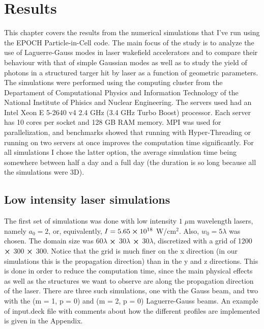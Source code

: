 \documentclass[12pt, class=report, crop=false]{standalone}
\begin{document}
\chapter{Results}%
\label{chap:results}

This chapter covers the results from the numerical simulations that I've run using the EPOCH Particle-in-Cell code. The main focus of the study is to analyze the use of Laguerre-Gauss modes in laser wakefield accelerators and to compare their behaviour with that of simple Gaussian modes as well as to study the yield of photons in a structured targer hit by laser as a function of geometric parameters. The simulations were performed using the computing cluster from the Departament of Computational Physics and Information Technology of the National Institute of Phisics and Nuclear Engineering. The servers used had an Intel\textsuperscript{\tiny\textregistered} Xeon\textsuperscript{\tiny\textregistered} E 5-2640 v4 2.4 GHz (3.4 GHz Turbo Boost) processor. Each server has 10 cores per socket and 128 GB RAM memory. MPI was used for parallelization, and benchmarks showed that running with Hyper-Threading or running on two servers at once improves the computation time significantly. For all simulations I chose the latter option, the average simulation time being somewhere between half a day and a full day (the duration is so long because all the simulations were 3D).

\section{Low intensity laser simulations}

The first set of simulations was done with low intensity \(1\; \mu\)m wavelength lasers, namely \(a_0 = 2\), or, equivalently, \(I = 5.65 \cp 10^{18}\) W/cm$^2$. Also, \(w_0 = 5\lambda\) was chosen. The domain size was 60$\lambda$ $\cp$ 30$\lambda$ $\cp$ 30$\lambda$, discretized with a grid of 1200 $\cp$ 300 $\cp$ 300. Notice that the grid is much finer on the x direction (in our simulations this is the propagation direction) than in the y and z directions. This is done in order to reduce the computation time, since the main physical effects as well as the structures we want to observe are along the propagation direction of the laser. There are three such simulations, one with the Gauss beam, and two with the (m = 1, p = 0) and (m = 2, p = 0) Laguerre-Gauss beams. An example of input.deck file with comments about how the different profiles are implemented is given in the Appendix.
\end{document}
